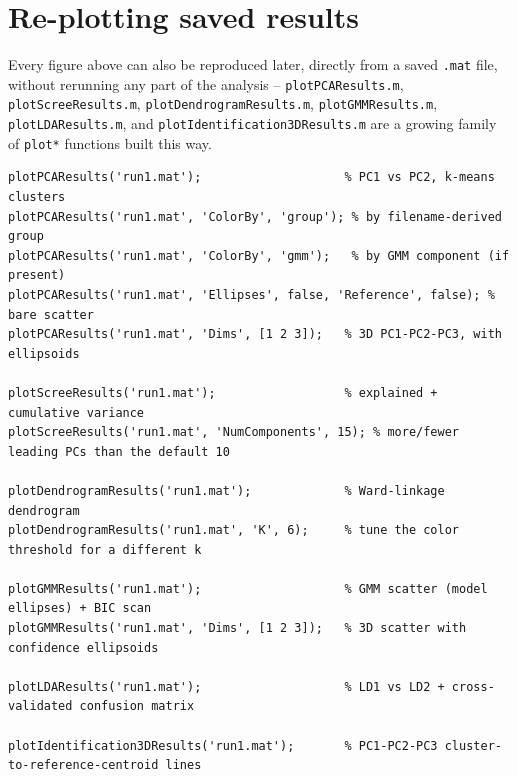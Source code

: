 \documentclass[11pt,a4paper]{article}
\newcommand{\code}[1]{\texttt{#1}}
\begin{document}
\section{Re-plotting saved results}
\label{sec:replotting}
Every figure above can also be reproduced later, directly from a saved
\code{.mat} file, without rerunning any part of the analysis --
\code{plotPCAResults.m}, \code{plotScreeResults.m},
\code{plotDendrogramResults.m}, \code{plotGMMResults.m},
\code{plotLDAResults.m}, and \code{plotIdentification3DResults.m} are a
growing family of \code{plot*} functions built this way.

\begin{lstlisting}[style=matlabstyle]
plotPCAResults('run1.mat');                    % PC1 vs PC2, k-means clusters
plotPCAResults('run1.mat', 'ColorBy', 'group'); % by filename-derived group
plotPCAResults('run1.mat', 'ColorBy', 'gmm');   % by GMM component (if present)
plotPCAResults('run1.mat', 'Ellipses', false, 'Reference', false); % bare scatter
plotPCAResults('run1.mat', 'Dims', [1 2 3]);   % 3D PC1-PC2-PC3, with ellipsoids

plotScreeResults('run1.mat');                  % explained + cumulative variance
plotScreeResults('run1.mat', 'NumComponents', 15); % more/fewer leading PCs than the default 10

plotDendrogramResults('run1.mat');             % Ward-linkage dendrogram
plotDendrogramResults('run1.mat', 'K', 6);     % tune the color threshold for a different k

plotGMMResults('run1.mat');                    % GMM scatter (model ellipses) + BIC scan
plotGMMResults('run1.mat', 'Dims', [1 2 3]);   % 3D scatter with confidence ellipsoids

plotLDAResults('run1.mat');                    % LD1 vs LD2 + cross-validated confusion matrix

plotIdentification3DResults('run1.mat');       % PC1-PC2-PC3 cluster-to-reference-centroid lines
\end{lstlisting}
\end{document}
